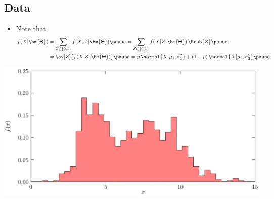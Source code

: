 \begin{slide}
\section[-2]{Data}

\begin{PauseHighLight}
  \begin{itemize}
  \item Note that
    \begin{align*}
      f(X|\bm{\Theta}) &= \sum_{Z\in\{0,1\}} f(X,Z|\bm{\Theta})\pause 
                         = \sum_{Z\in\{0,1\}}
      f(X|Z,\bm{\Theta})\,\Prob{Z}\pause \\ &= \av[Z]{f(X|Z,\bm{\Theta})}\pause
      = p \, \normal{X\big|\mu_1,\sigma_1^2} +
      (1-p)\,\normal{X\big|\mu_2,\sigma_2^2}\pause
    \end{align*}
  \end{itemize}
  \begin{center}
    \includegraphics[width=0.8\linewidth]{mixtureOfGaussiansData}\pause
  \end{center}
\end{PauseHighLight}

\end{slide}


